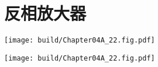 \section{反相放大器}

\begin{Figure}
    \begin{FigureSub}
        \texttt{[image: build/Chapter04A\_22.fig.pdf]}
    \end{FigureSub}
    \begin{FigureSub}
        \texttt{[image: build/Chapter04A\_22.fig.pdf]}
    \end{FigureSub}
\end{Figure}